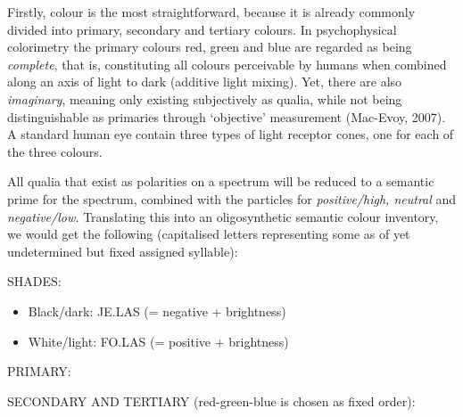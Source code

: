 \noindent Firstly, colour is the most straightforward, because it is already commonly divided into primary, secondary and tertiary colours. In psychophysical colorimetry the primary colours red, green and blue are regarded as being \textit{complete}, that is, constituting all colours perceivable by humans when combined along an axis of light to dark (additive light mixing). Yet, there are also \textit{imaginary}, meaning only existing subjectively as qualia, while not being distinguishable as primaries through ‘objective’ measurement (Mac-Evoy, 2007). A standard human eye contain three types of light receptor cones, one for each of the three colours. 

All qualia that exist as polarities on a spectrum will be reduced to a semantic prime for the spectrum, combined with the particles for \textit{positive/high, neutral} and \textit{negative/low.} Translating this into an oligosynthetic semantic colour inventory, we would get the following (capitalised letters representing some as of yet undetermined but fixed assigned syllable): 

\vspace{0.1cm}

SHADES: 
\begin{itemize}

\item    Black/dark: JE.LAS \je \las (= negative + brightness) 

    \item White/light: FO.LAS \fo \las (= positive + brightness) 
\end{itemize}
\quad

PRIMARY: 
\quad


\noindent SECONDARY AND TERTIARY (red-green-blue is chosen as fixed order): 

